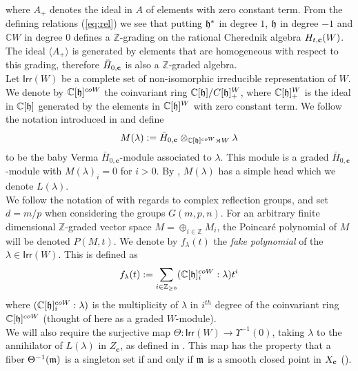 \documentclass[a4apper,10pt]{amsart}
\theoremstyle{definition}
\numberwithin{thm}{section}
\newcommand{\Z}{\mathbb{Z}}
\newcommand{\C}{\mathbb{C}}
\newcommand{\Irr}{\mathsf{Irr}}
\begin{document}
\noindent where $A_+$ denotes the ideal in $A$ of elements with zero constant term. From the defining relations (\ref{eq:rel}) we see that putting $\frak{h}^*$ in degree $1$, $\frak{h}$ in degree $-1$ and $\C W$ in degree $0$ defines a $\Z$-grading on the rational Cherednik algebra $H_{t,\bf{c}}(W)$. The ideal $\langle A_+ \rangle$ is generated by elements that are homogeneous with respect to this grading, therefore $\bar{H}_{0,\bf{c}}$ is also a $\Z$-graded algebra.\\ 

\noindent Let $\Irr(W)$ be a complete set of non-isomorphic irreducible representation of $W$. We denote by $\C[\frak{h}]^{coW}$ the coinvariant ring $\C[\frak{h}]/ C[\frak{h}]^W_+$, where $\C[\frak{h}]^W_+$ is the ideal in $\C[\frak{h}]$ generated by the elements in $\C[\frak{h}]^W$ with zero constant term. We follow the notation introduced in \cite{6} and define 
\begin{displaymath}
M(\lambda) := \bar{H}_{0,\mathbf{c}} \otimes_{\C[\frak{h}]^{coW} \rtimes W} \lambda 
\end{displaymath}
to be the baby Verma $\bar{H}_{0,\mathbf{c}}$-module associated to $\lambda$. This module is a graded $\bar{H}_{0,\mathbf{c}}$-module with $M(\lambda)_i = 0$ for $i > 0$. By \cite[Proposition 4.3]{6}, $M(\lambda)$ has a simple head which we denote $L(\lambda)$.\\

\noindent We follow the notation of \cite{7} with regards to complex reflection groups, and set $d = m/p$ when considering the groups $G(m,p,n)$. For an arbitrary finite dimensional $\Z$-graded vector space $M = \oplus_{i \in \Z} M_i$, the Poincar\'e polynomial of $M$ will be denoted $P(M,t)$. We denote by $f_{\lambda}(t)$ the \textit{fake polynomial} of the $\lambda \in \Irr(W)$. This is defined as
\begin{displaymath}
f_{\lambda}(t) := \sum_{i \in \Z_{\ge 0}} (\C[\frak{h}]^{coW}_i : \lambda)t^i
\end{displaymath}
where $(\C[\frak{h}]^{coW}_i : \lambda)$ is the multiplicity of $\lambda$ in $i^{th}$ degree of the coinvariant ring $\C[\frak{h}]^{coW}$ (thought of here as a graded $W$-module).\\

\noindent We will also require the surjective map $\Theta : \Irr(W) \rightarrow \Upsilon^{-1}(0)$, taking $\lambda$ to the annihilator of $L(\lambda)$ in $Z_{\mathbf{c}}$, as defined in \cite[paragraph 5.4]{6}. This map has the property that a fiber $\Theta^{-1}(\frak{m})$ is a singleton set if and only if $\frak{m}$ is a smooth closed point in $X_{\bf c}$ (\cite[Theorem 5.6]{6}). 
\end{document}
